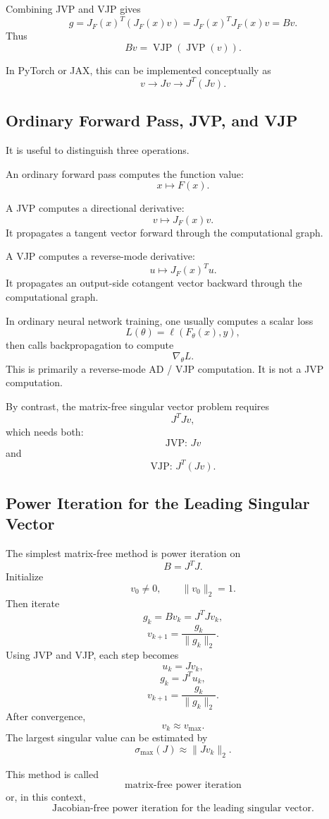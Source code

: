\documentclass{article}
\begin{document}
Combining JVP and VJP gives
\[
g
=
J_F(x)^T(J_F(x)v)
=
J_F(x)^TJ_F(x)v
=
Bv.
\]
Thus
\[
\boxed{
Bv
=
\operatorname{VJP}
\left(
\operatorname{JVP}(v)
\right).
}
\]

In PyTorch or JAX, this can be implemented conceptually as
\[
v
\longrightarrow
Jv
\longrightarrow
J^T(Jv).
\]

\subsection{Ordinary Forward Pass, JVP, and VJP}

It is useful to distinguish three operations.

An ordinary forward pass computes the function value:
\[
x\mapsto F(x).
\]

A JVP computes a directional derivative:
\[
v\mapsto J_F(x)v.
\]
It propagates a tangent vector forward through the computational graph.

A VJP computes a reverse-mode derivative:
\[
u\mapsto J_F(x)^Tu.
\]
It propagates an output-side cotangent vector backward through the computational graph.

In ordinary neural network training, one usually computes a scalar loss
\[
L(\theta)=\ell(F_\theta(x),y),
\]
then calls backpropagation to compute
\[
\nabla_\theta L.
\]
This is primarily a reverse-mode AD / VJP computation. It is not a JVP computation.

By contrast, the matrix-free singular vector problem requires
\[
J^TJv,
\]
which needs both:
\[
\boxed{
\text{JVP: }Jv
}
\]
and
\[
\boxed{
\text{VJP: }J^T(Jv).
}
\]

\subsection{Power Iteration for the Leading Singular Vector}

The simplest matrix-free method is power iteration on
\[
B=J^TJ.
\]
Initialize
\[
v_0\neq 0,\qquad \|v_0\|_2=1.
\]
Then iterate
\[
g_k=Bv_k=J^TJv_k,
\]
\[
v_{k+1}
=
\frac{g_k}{\|g_k\|_2}.
\]
Using JVP and VJP, each step becomes
\[
u_k=Jv_k,
\]
\[
g_k=J^Tu_k,
\]
\[
v_{k+1}
=
\frac{g_k}{\|g_k\|_2}.
\]
After convergence,
\[
v_k\approx v_{\max}.
\]
The largest singular value can be estimated by
\[
\sigma_{\max}(J)
\approx
\|Jv_k\|_2.
\]

This method is called
\[
\boxed{
\text{matrix-free power iteration}
}
\]
or, in this context,
\[
\boxed{
\text{Jacobian-free power iteration for the leading singular vector.}
}
\]
\end{document}

